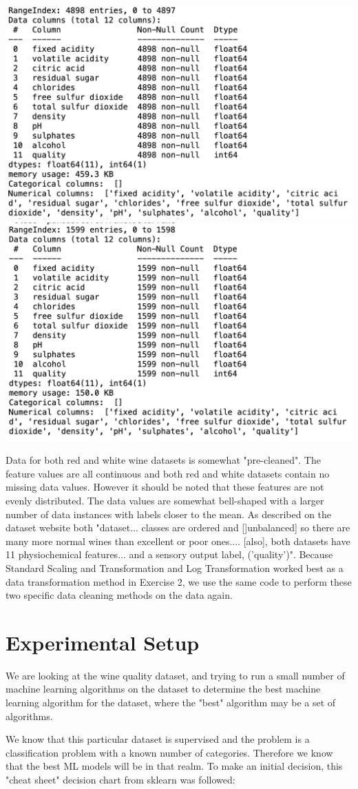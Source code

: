 \documentclass[titlepage]{article}
\begin{document}
	\includegraphics[width=.45\textwidth]{img/white.png}
	\includegraphics[width=.45\textwidth]{img/red.png}
	
	\noindent Data for both red and white wine datasets is somewhat "pre-cleaned".   The feature values are all continuous and both red and white datasets contain no missing data values.  However it should be noted that these features are not evenly distributed.  The data values are somewhat bell-shaped with a larger number of data instances with labels closer to the mean.  As described on the dataset website \cite{dataset} both "dataset... classes are ordered and []unbalanced] so there are many more normal wines than excellent or poor ones.... [also], both datasets have 11 physiochemical features... and a sensory output label, ('quality')".  Because Standard Scaling and Transformation and Log Transformation worked best as a data transformation method in Exercise 2, we use the same code to perform these two specific data cleaning methods on the data again.  
	
	\section*{Experimental Setup}
	
		We are looking at the wine quality dataset, and trying to run a small number of machine learning algorithms on the dataset to determine the best machine learning algorithm for the dataset, where the "best" algorithm may be a set of algorithms.
		
		We know that this particular dataset is supervised and the problem is a classification problem with a known number of categories. Therefore we know that the best ML models will be in that realm.  To make an initial decision, this "cheat sheet" decision chart from sklearn \cite{scikitlearn} was followed: 
		
\end{document}
